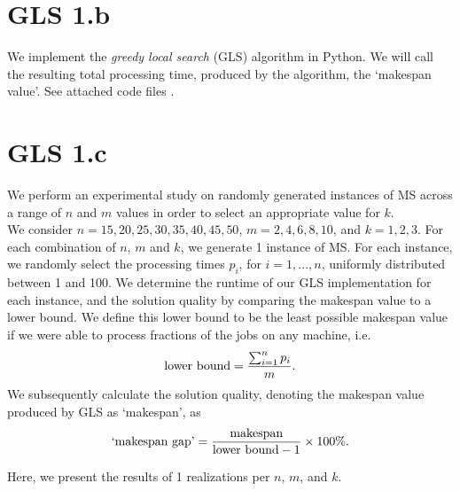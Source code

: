 \documentclass[12pt,a4paper,reqno]{article}
\begin{document}
\section*{GLS 1.b}
We implement the \textit{greedy local search} (GLS) algorithm in Python. We will call the resulting total processing time, produced by the algorithm, the `makespan value'. See attached \color{red} code files \color{black}. \\

\section*{GLS 1.c}
We perform an experimental study on randomly generated instances of MS across a range of $n$ and $m$ values in order to select an appropriate value for $k$. \\

We consider $n=15, 20, 25, 30, 35, 40, 45, 50$, $m=2,4,6,8,10$, and $k=1,2,3$. For each combination of $n$, $m$ and $k$, we generate 1 instance of MS. For each instance, we randomly select the processing times $p_i$, for $i=1,...,n$, uniformly distributed between 1 and 100. We determine the runtime of our GLS implementation for each instance, and the solution quality by comparing the makespan value to a lower bound. We define this lower bound to be the least possible makespan value if we were able to process fractions of the jobs on any machine, i.e.
\begin{equation}
\textnormal{lower bound} = \frac{\sum_{i=1}^n p_i}{m}.
\end{equation}
We subsequently calculate the solution quality, denoting the makespan value produced by GLS as `makespan', as
\begin{equation}
\textnormal{`makespan gap'} = \frac{\textnormal{makespan}}{\textnormal{lower bound} - 1} \times 100\%.
\end{equation}
 
Here, we present the results of 1 realizations per $n$, $m$, and $k$. \\
\end{document}
